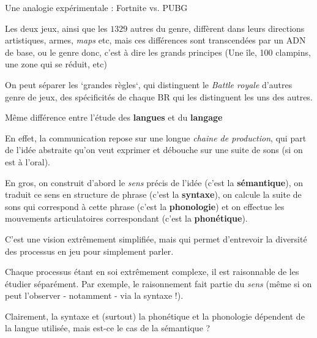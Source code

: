 \begin{frame}
	\pause
Une analogie expérimentale : \pause Fortnite vs. PUBG \newline \pause
	
Les deux jeux, ainsi que les $1329$ autres du genre, diffèrent dans leurs directions artistiques, armes, \textit{maps} etc\pause, mais ces différences sont transcendées par un ADN de base, ou le genre donc, c'est à dire les grands principes (Une île, 100 clampins, une zone qui se réduit, etc) \newline \pause

On peut séparer les `grandes règles`, qui distinguent le \textit{Battle royale} d'autres genre de jeux, des spécificités de chaque BR qui les distinguent les uns des autres. \newline \pause

Même différence entre l'étude des \textbf{langues} \pause et du \textbf{langage}

\end{frame}



\begin{frame}

En effet, la communication repose sur une longue \textit{chaine de production}, qui part de l'idée abstraite qu'on veut exprimer et débouche sur une suite de sons (si on est à l'oral).\pause \newline

En gros, on construit d'abord le \textit{sens} précis de l'idée (c'est la \textbf{sémantique}), on traduit ce sens en structure de phrase (c'est la \textbf{syntaxe}), on calcule la suite de sons qui correspond à cette phrase (c'est la \textbf{phonologie}) et on effectue les mouvements articulatoires correspondant (c'est la \textbf{phonétique}).\newline


\end{frame}

\begin{frame}

C'est une vision extrêmement simplifiée, mais qui permet d'entrevoir la diversité des processus en jeu pour simplement parler.\pause \newline

Chaque processus étant en soi extrêmement complexe, il est raisonnable de les étudier séparément. Par exemple, le raisonnement fait partie du \textit{sens} \pause(même si on peut l'observer - notamment - via la syntaxe !).\pause \newline

Clairement, la syntaxe et (surtout) la phonétique et la phonologie dépendent de la langue utilisée, mais est-ce le cas de la sémantique ?


\end{frame}



